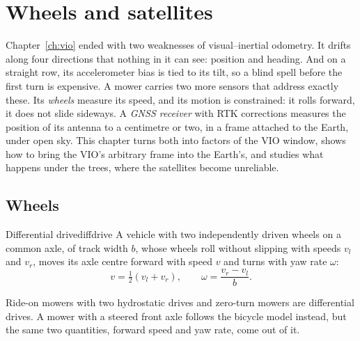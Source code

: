 \chapter{Wheels and satellites}
\label{ch:wheels}

Chapter~\ref{ch:vio} ended with two weaknesses of visual--inertial
odometry. It drifts along four directions that nothing in it can see:
position and heading. And on a straight row, its accelerometer bias is
tied to its tilt, so a blind spell before the first turn is expensive.
A mower carries two more sensors that address exactly these. Its
\emph{wheels} measure its speed, and its motion is constrained: it rolls
forward, it does not slide sideways. A \emph{GNSS receiver} with RTK
corrections measures the position of its antenna to a centimetre or
two, in a frame attached to the Earth, under open sky. This chapter
turns both into factors of the VIO window, shows how to bring the VIO's
arbitrary frame into the Earth's, and studies what happens under the
trees, where the satellites become unreliable.

\section{Wheels}

\begin{definition}{Differential drive}{diffdrive}
A vehicle with two independently driven wheels on a common axle, of
track width $b$, whose wheels roll without slipping with speeds $v_l$
and $v_r$, moves its axle centre forward with speed $v$ and turns with
yaw rate $\omega$:
\begin{equation}\label{eq:diffdrive}
v=\tfrac12(v_l+v_r),\qquad\omega=\frac{v_r-v_l}{b}.
\end{equation}
\end{definition}

Ride-on mowers with two hydrostatic drives and zero-turn mowers are
differential drives. A mower with a steered front axle follows the
bicycle model instead, but the same two quantities, forward speed and
yaw rate, come out of it.

